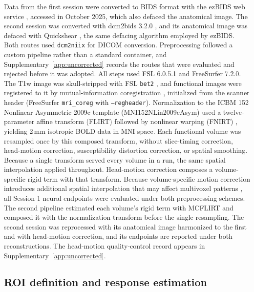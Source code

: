 Data from the first session were converted to BIDS format with the ezBIDS web service \parencite{levitas2024}, accessed in October 2025, which also defaced the anatomical image. The second session was converted with dcm2bids 3.2.0 \parencite{dcm2bids}, and its anatomical image was defaced with Quickshear \parencite{schimke2011}, the same defacing algorithm employed by ezBIDS. Both routes used \texttt{dcm2niix} for DICOM conversion. Preprocessing followed a custom pipeline rather than a standard container, and Supplementary~\cref{app:uncorrected} records the routes that were evaluated and rejected before it was adopted. All steps used FSL 6.0.5.1 and FreeSurfer 7.2.0. The T1w image was skull-stripped with FSL \texttt{bet2} \parencite{smith2002}, and functional images were registered to it by mutual-information coregistration \parencite{wells1996, maes1997}, initialized from the scanner header (FreeSurfer \texttt{mri\_coreg} with \texttt{--regheader}). Normalization to the ICBM 152 Nonlinear Asymmetric 2009c template (MNI152NLin2009cAsym) used a twelve-parameter affine transform (FLIRT) followed by nonlinear warping (FNIRT) \parencite{jenkinson2002, andersson2007}, yielding 2\,mm isotropic BOLD data in MNI space. Each functional volume was resampled once by this composed transform, without slice-timing correction, head-motion correction, susceptibility distortion correction, or spatial smoothing. Because a single transform served every volume in a run, the same spatial interpolation applied throughout. Head-motion correction composes a volume-specific rigid term with that transform. Because volume-specific motion correction introduces additional spatial interpolation that may affect multivoxel patterns \parencite{grootoonk2000}, all Session-1 neural endpoints were evaluated under both preprocessing schemes. The second pipeline estimated each volume's rigid term with MCFLIRT \parencite{jenkinson2002} and composed it with the normalization transform before the single resampling. The second session was reprocessed with its anatomical image harmonized to the first and with head-motion correction, and its endpoints are reported under both reconstructions. The head-motion quality-control record appears in Supplementary~\cref{app:uncorrected}.

\subsection{ROI definition and response estimation}
\label{sec:methods:roi}

